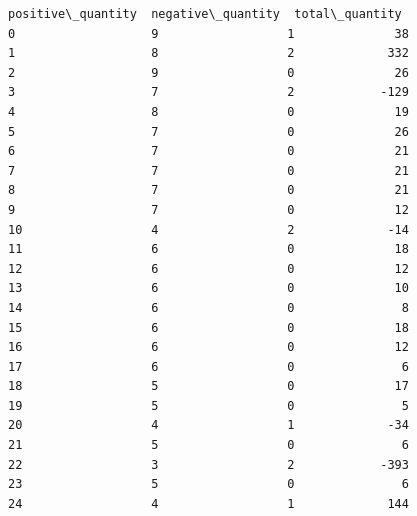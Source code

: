 \documentclass[11pt]{article}
\begin{document}
\begin{Verbatim}[commandchars=\\\{\}]
    positive\_quantity  negative\_quantity  total\_quantity  
0                   9                  1              38  
1                   8                  2             332  
2                   9                  0              26  
3                   7                  2            -129  
4                   8                  0              19  
5                   7                  0              26  
6                   7                  0              21  
7                   7                  0              21  
8                   7                  0              21  
9                   7                  0              12  
10                  4                  2             -14  
11                  6                  0              18  
12                  6                  0              12  
13                  6                  0              10  
14                  6                  0               8  
15                  6                  0              18  
16                  6                  0              12  
17                  6                  0               6  
18                  5                  0              17  
19                  5                  0               5  
20                  4                  1             -34  
21                  5                  0               6  
22                  3                  2            -393  
23                  5                  0               6  
24                  4                  1             144  
    \end{Verbatim}
\end{document}

